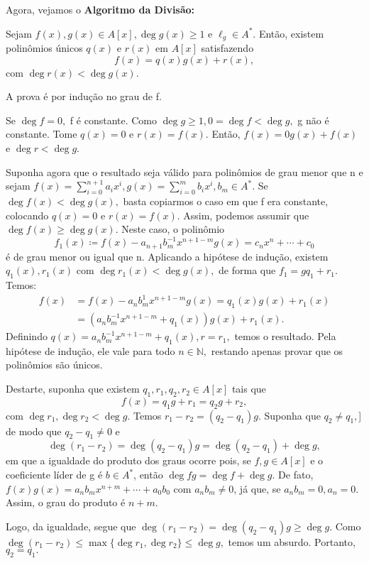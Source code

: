 \documentclass[algebraII_notes.tex]{subfiles}
\begin{document}
Agora, vejamos o \textbf{Algoritmo da Divisão:}
\begin{theorem*}
	Sejam \(f(x), g(x)\in A[x], \deg{g(x)}\geq 1\) e \(\ell_{g}\in A^{*}.\) Então,
	existem polinômios únicos \(q(x)\) e \(r(x)\) em \(A[x]\) satisfazendo
	\[
		f(x) = q(x)g(x) + r(x),
	\]
	com \(\deg{r(x)} < \deg{g(x)}.\)
\end{theorem*}
\begin{proof*}
	A prova é por indução no grau de f.

	Se \(\deg{f}=0,\) f é constante. Como \(\deg{g}\geq 1, 0 = \deg{f} < \deg{g},\) g não é constante.
	Tome \(q(x) = 0\) e \(r(x) = f(x).\) Então, \(f(x) = 0g(x) + f(x)\) e \(\deg{r} < \deg{g}.\)

	Suponha agora que o resultado seja válido para polinômios de grau menor que n e sejam \(f(x) = \sum\limits_{i=0}^{n+1}a_{i}x^{i}, g(x) = \sum\limits_{i=0}^{m}b_{i}x^{i}, b_{m}\in A^{*}\).
	Se \(\deg{f(x)} < \deg{g(x)},\) basta copiarmos o caso em que f era constante, colocando \(q(x) = 0\) e \(r(x) = f(x)\).
	Assim, podemos assumir que \(\deg{f(x)}\geq \deg{g(x)}.\) Neste caso, o polinômio
	\[
		f_{1}(x)\coloneqq f(x) - a_{n+1}b_{m}^{-1}x^{n+1-m}g(x) = c_{n}x^{n} + \cdots + c_{0}
	\]
	é de grau menor ou igual que n. Aplicando a hipótese de indução, existem \(q_{1}(x), r_{1}(x)\)
	com \(\deg{r_{1}(x)} < \deg{g(x)},\) de forma que \(f_{1} = gq_{1} + r_{1}.\) Temos:
	\begin{align*}
		f(x) & = f(x)-a_{n}b_{m}^{1}x^{n+1-m}g(x) = q_{1}(x)g(x) + r_{1}(x) \\
		     & = (a_{n}b_{m}^{-1}x^{n+1-m}+q_{1}(x))g(x) + r_{1}(x).
	\end{align*}
	Definindo \(q(x) = a_{n}b_{m}^{-1}x^{n+1-m}+q_{1}(x), r = r_{1},\) temos o resultado. Pela hipótese
	de indução, ele vale para todo \(n\in \mathbb{N},\) restando apenas provar que os polinômios são únicos.

	Destarte, suponha que existem \(q_{1}, r_{1}, q_{2}, r_{2}\in A[x]\) tais que
	\[
		f(x) = q_{1}g+r_{1} = q_{2}g+r_{2},
	\]
	com \(\deg{r_{1}}, \deg{r_{2}} < \deg{g}.\) Temos \(r_{1}-r_{2} = (q_{2}-q_{1})g.\) Suponha que \(q_{2}\neq q_{1},\)]
	de modo que \(q_{2}-q_{1}\neq0\) e
	\[
		\deg{(r_{1}-r_{2})} = \deg{(q_{2}-q_{1})}g = \deg{(q_{2}-q_{1})} + \deg{g},
	\]
	em que a igualdade do produto dos graus ocorre pois, se \(f, g\in A[x]\) e o coeficiente líder de g é \(b\in A^{*}\),
	então \(\deg{fg} = \deg{f} + \deg{g}.\) De fato, \(f(x)g(x) = a_{n}b_{m}x^{n+m} + \cdots + a_{0}b_{0}\) com
	\(a_{n}b_{m}\neq0\), já que, se \(a_{n}b_{m} = 0, a_{n} = 0.\) Assim, o grau do produto é \(n+m\).

	Logo, da igualdade, segue que \(\deg{(r_{1}-r_{2})} = \deg{(q_{2}-q_{1})g}\geq \deg{g}.\) Como
	\(\deg{(r_{1}-r_{2})}\leq \max\{\deg{r_{1}}, \deg{r_{2}}\}\leq \deg{g},\) temos um absurdo. Portanto,
	\(q_{2} = q_{1}.\) \qedsymbol
\end{proof*}
\end{document}
